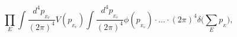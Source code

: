 \begin{equation}
\prod\limits_{E}
\int \frac{d^4p_{{}_{E_V}}}{(2\pi)^4} V(p_{{}_{E_V}})
\int \frac{d^4p_{{}_{E_\phi}}}{(2\pi)^4} \phi(p_{{}_{E_\phi}})
\cdot \ldots\cdot
(2\pi)^4 \delta\Big(\sum\limits_{E} p_{{}_E}\Big),
\end{equation}

